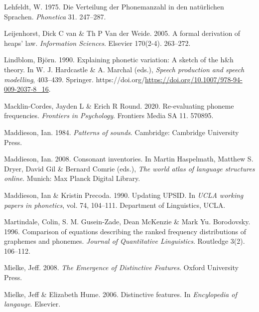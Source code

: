 \documentclass[
]{article}
\newlength{\cslhangindent}
\newlength{\cslentryspacingunit} %
\newenvironment{CSLReferences}[2] %
 {%
  \setlength{\parindent}{0pt}
  \ifodd #1
  \let\oldpar\par
  \def\par{\hangindent=\cslhangindent\oldpar}
  \fi
  \setlength{\parskip}{#2\cslentryspacingunit}
 }%
 {}
\begin{document}
\begin{CSLReferences}{1}{0}
\leavevmode{}%
Lehfeldt, W. 1975. {Die Verteilung der Phonemanzahl in den nat{ü}rlichen
Sprachen}. \emph{Phonetica} 31. 247--287.

\leavevmode{}%
Leijenhorst, Dick C van \& Th P Van der Weide. 2005. A formal derivation
of heaps' law. \emph{Information Sciences}. Elsevier 170(2-4). 263--272.

\leavevmode{}%
Lindblom, Björn. 1990. Explaining phonetic variation: A sketch of the
h\&h theory. In W. J. Hardcastle \& A. Marchal (eds.), \emph{Speech
production and speech modelling}, 403--439. Springer.
https://doi.org/\url{https://doi.org/10.1007/978-94-009-2037-8_16}.

\leavevmode{}%
Macklin-Cordes, Jayden L \& Erich R Round. 2020. Re-evaluating phoneme
frequencies. \emph{Frontiers in Psychology}. Frontiers Media SA 11.
570895.

\leavevmode{}%
Maddieson, Ian. 1984. \emph{Patterns of sounds}. Cambridge: Cambridge
University Press.

\leavevmode{}%
Maddieson, Ian. 2008. Consonant inventories. In Martin Haspelmath,
Matthew S. Dryer, David Gil \& Bernard Comrie (eds.), \emph{The world
atlas of language structures online}. Munich: Max Planck Digital
Library.

\leavevmode{}%
Maddieson, Ian \& Kristin Precoda. 1990. {Updating UPSID}. In \emph{UCLA
working papers in phonetics}, vol. 74, 104--111. Department of
Linguistics, UCLA.

\leavevmode{}%
Martindale, Colin, S. M. Gusein‐Zade, Dean McKenzie \& Mark Yu.
Borodovsky. 1996. Comparison of equations describing the ranked
frequency distributions of graphemes and phonemes. \emph{Journal of
Quantitative Linguistics}. Routledge 3(2). 106--112.

\leavevmode{}%
Mielke, Jeff. 2008. \emph{{The Emergence of Distinctive Features}}.
Oxford University Press.

\leavevmode{}%
Mielke, Jeff \& Elizabeth Hume. 2006. Distinctive features. In
\emph{Encylopedia of langauge}. Elsevier.


\end{CSLReferences}
\end{document}
